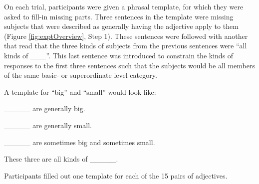 \documentclass[doc]{apa6}
\begin{document}
On each trial, participants were given a phrasal template, for which they were asked to fill-in missing parts.
Three sentences in the template were missing subjects that were described as generally having the adjective apply to them (Figure \ref{fig:exptOverview}, Step 1). 
These sentences were followed with another that read that the three kinds of subjects from the previous sentences were ``all kinds of \_\_\_''.
This last sentence was introduced to constrain the kinds of responses to the first three sentences such that the subjects would be all members of the same basic- or superordinate level category. 

A template for ``big'' and ``small'' would look like: 
\begin{description}[noitemsep]
\item \_\_\_\_\_ are generally big.
\item  \_\_\_\_\_ are generally small.
\item \_\_\_\_\_ are sometimes big and sometimes small.
\item These three are all kinds of \_\_\_\_\_.
\end{description}

Participants filled out one template for each of the 15 pairs of adjectives. 
\end{document}
